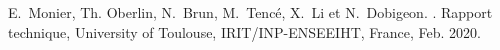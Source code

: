 \begin{fullwidth}

        E.~Monier, Th. Oberlin, N.~Brun, M.~Tenc\'e, X.~Li et N.~Dobigeon.
        .
        \newblock Rapport technique, University of Toulouse, IRIT/INP-ENSEEIHT, France,
          Feb. 2020.




\end{fullwidth}